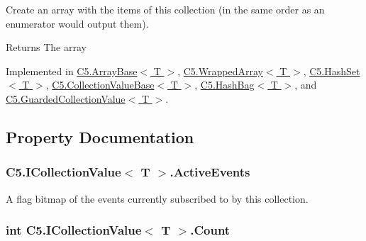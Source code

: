Create an array with the items of this collection (in the same order as an enumerator would output them). 

\begin{DoxyReturn}{Returns}
The array
\end{DoxyReturn}


Implemented in \hyperlink{class_c5_1_1_array_base_a16ffcc583a32065194b3ea27d4a43cd4}{C5.\+Array\+Base$<$ T $>$}, \hyperlink{class_c5_1_1_wrapped_array_a58fc7250416e58474a98d17a538fb9e2}{C5.\+Wrapped\+Array$<$ T $>$}, \hyperlink{class_c5_1_1_hash_set_ad6e22ebc64d9f8c96b805547d5873023}{C5.\+Hash\+Set$<$ T $>$}, \hyperlink{class_c5_1_1_collection_value_base_a740757aebaa1365811e76729e59f338d}{C5.\+Collection\+Value\+Base$<$ T $>$}, \hyperlink{class_c5_1_1_hash_bag_a7be4bcb7a5ef7f9414a33cfb9439e15e}{C5.\+Hash\+Bag$<$ T $>$}, and \hyperlink{class_c5_1_1_guarded_collection_value_ab492c6c9d057b13d2ccbb7ebc259a4f6}{C5.\+Guarded\+Collection\+Value$<$ T $>$}.



\subsection{Property Documentation}
\hypertarget{interface_c5_1_1_i_collection_value_a255e04159eaa809e157ce453dc4b2340}{}
\subsubsection[{Active\+Events}]{ {\bf C5.\+I\+Collection\+Value}$<$ T $>$.Active\+Events\hspace{0.3cm}{\ttfamily [get]}}\label{interface_c5_1_1_i_collection_value_a255e04159eaa809e157ce453dc4b2340}


A flag bitmap of the events currently subscribed to by this collection. 

\hypertarget{interface_c5_1_1_i_collection_value_ac02f774c320d7e93e3020ac124de5c96}{}
\subsubsection[{Count}]{\setlength{\rightskip}{0pt plus 5cm}int {\bf C5.\+I\+Collection\+Value}$<$ T $>$.Count\hspace{0.3cm}{\ttfamily [get]}}\label{interface_c5_1_1_i_collection_value_ac02f774c320d7e93e3020ac124de5c96}





